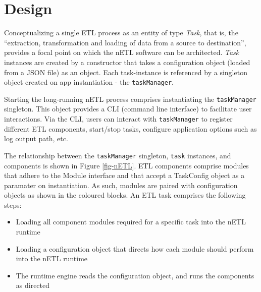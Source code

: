 \section{Design}
Conceptualizing a single ETL process as an entity of type \textit{Task}, that is, the ``extraction, transformation and loading of data from a source to destination'', provides a focal point on which the nETL software can be architected. \textit{Task} instances are created by a constructor that takes a configuration object (loaded from a JSON file) as an object. Each task-instance is referenced by a singleton object created on app instantiation - the \texttt{taskManager}.

Starting the long-running nETL process comprises instantiating the \texttt{taskManager} singleton. This object provides a CLI (command line interface) to facilitate user interactions. Via the CLI, users can interact with \texttt{taskManager} to register different ETL components, start/stop tasks, configure application options such as log output path, etc.

The relationship between the \texttt{taskManager} singleton, \texttt{task} instances, and components is shown in Figure \ref{fig-nETL}. ETL components comprise modules that adhere to the Module interface and that accept a TaskConfig object as a paramater on instantiation. As such, modules are paired with configuration objects as shown in the coloured blocks. An ETL task comprises the following steps:

\begin{itemize}
    \item Loading all component modules required for a specific task into the nETL runtime
    \item Loading a configuration object that directs how each module should perform into the nETL runtime
    \item The runtime engine reads the configuration object, and runs the components as directed
\end{itemize}

